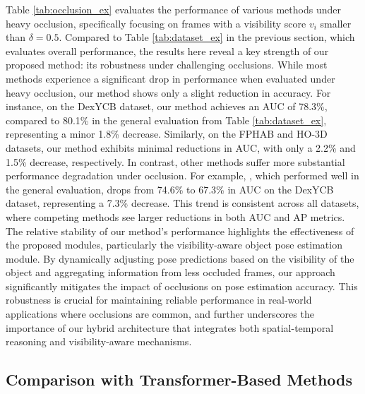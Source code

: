 Table \ref{tab:occlusion_ex} evaluates the performance of various methods under heavy occlusion, specifically focusing on frames with a visibility score \( v_i \) smaller than \( \delta = 0.5 \). Compared to Table \ref{tab:dataset_ex} in the previous section, which evaluates overall performance, the results here reveal a key strength of our proposed method: its robustness under challenging occlusions. While most methods experience a significant drop in performance when evaluated under heavy occlusion, our method shows only a slight reduction in accuracy. For instance, on the DexYCB dataset, our method achieves an AUC of 78.3\%, compared to 80.1\% in the general evaluation from Table \ref{tab:dataset_ex}, representing a minor 1.8\% decrease. Similarly, on the FPHAB and HO-3D datasets, our method exhibits minimal reductions in AUC, with only a 2.2\% and 1.5\% decrease, respectively. In contrast, other methods suffer more substantial performance degradation under occlusion. For example, \cite{wang2023deep}, which performed well in the general evaluation, drops from 74.6\% to 67.3\% in AUC on the DexYCB dataset, representing a 7.3\% decrease. This trend is consistent across all datasets, where competing methods see larger reductions in both AUC and AP metrics. The relative stability of our method's performance highlights the effectiveness of the proposed modules, particularly the visibility-aware object pose estimation module. By dynamically adjusting pose predictions based on the visibility of the object and aggregating information from less occluded frames, our approach significantly mitigates the impact of occlusions on pose estimation accuracy. This robustness is crucial for maintaining reliable performance in real-world applications where occlusions are common, and further underscores the importance of our hybrid architecture that integrates both spatial-temporal reasoning and visibility-aware mechanisms.

\subsection{Comparison with Transformer-Based Methods}

